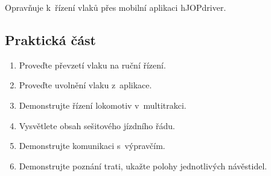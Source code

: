 \documentclass[12pt,a4paper]{article}
\begin{document}
Opravňuje k~řízení vlaků přes mobilní aplikaci hJOPdriver.

\subsection{Praktická část}

\begin{enumerate}[leftmargin=*]
\item Proveďte převzetí vlaku na ruční řízení.
\item Proveďte uvolnění vlaku z~aplikace.
\item Demonstrujte řízení lokomotiv v~multitrakci.
\item Vysvětlete obsah sešitového jízdního řádu.
\item Demonstrujte komunikaci s~výpravčím.
\item Demonstrujte poznání trati, ukažte polohy jednotlivých návěstidel.
\end{enumerate}
\end{document}
